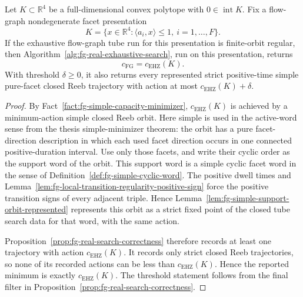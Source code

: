 \begin{unverified}
\begin{theorem}%
\label{thm:fg-real-capacity-correctness}
Let \(K\subset\mathbb R^4\) be a full-dimensional convex polytope with
\(0\in\operatorname{int}K\).  Fix a flow-graph nondegenerate facet
presentation
\[
  K=\{x\in\mathbb R^4:\langle a_i,x\rangle\le1,\ i=1,\ldots,F\}.
\]
If the exhaustive flow-graph tube run for this presentation is finite-orbit
regular, then Algorithm~\ref{alg:fg-real-exhaustive-search}, run on this
presentation, returns
\[
  c_{\mathrm{FG}}=c_{\mathrm{EHZ}}(K).
\]
With threshold \(\delta\ge0\), it also returns every represented strict
positive-time simple pure-facet closed Reeb trajectory with action at most
\(c_{\mathrm{EHZ}}(K)+\delta\).
\end{theorem}

\begin{proof}
By Fact~\ref{fact:fg-simple-capacity-minimizer}, \(c_{\mathrm{EHZ}}(K)\) is
achieved by a minimum-action simple closed Reeb orbit.  Here simple is used in
the active-word sense from the thesis simple-minimizer theorem: the orbit has
a pure facet-direction description in which each used facet direction occurs
in one connected positive-duration interval.  Use only those facets, and write
their cyclic order as the support word of the orbit.  This support word is a
simple cyclic facet word in the sense of
Definition~\ref{def:fg-simple-cyclic-word}.  The positive dwell times and
Lemma~\ref{lem:fg-local-transition-regularity-positive-sign} force the
positive transition signs of every adjacent triple.  Hence
Lemma~\ref{lem:fg-simple-support-orbit-represented} represents this orbit as
a strict fixed point of the closed tube search data for that word, with the
same action.

Proposition~\ref{prop:fg-real-search-correctness} therefore records at least
one trajectory with action \(c_{\mathrm{EHZ}}(K)\).  It records only strict
closed Reeb trajectories, so none of its recorded actions can be less than
\(c_{\mathrm{EHZ}}(K)\).  Hence the reported minimum is exactly
\(c_{\mathrm{EHZ}}(K)\).  The threshold statement follows from the final
filter in Proposition~\ref{prop:fg-real-search-correctness}.
\end{proof}
\end{unverified}

